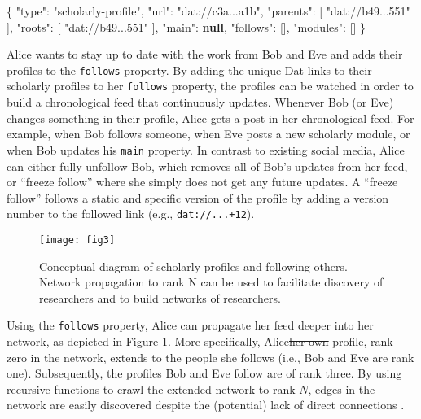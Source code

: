 \documentclass[publications,article,submit,moreauthors,pdftex,10pt,a4paper]{Definitions/mdpi}
\newenvironment{Shaded}{\begin{snugshade}}{\end{snugshade}}
\newcommand{\DataTypeTok}[1]{\textcolor[rgb]{0.13,0.29,0.53}{#1}}
\newcommand{\FunctionTok}[1]{\textcolor[rgb]{0.00,0.00,0.00}{#1}}
\newcommand{\KeywordTok}[1]{\textcolor[rgb]{0.13,0.29,0.53}{\textbf{#1}}}
\newcommand{\OtherTok}[1]{\textcolor[rgb]{0.56,0.35,0.01}{#1}}
\newcommand{\StringTok}[1]{\textcolor[rgb]{0.31,0.60,0.02}{#1}}
\providecommand{\DIFaddtex}[1]{{\protect\color{blue}\uwave{#1}}} %
\providecommand{\DIFdeltex}[1]{{\protect\color{red}\sout{#1}}}                      %
\providecommand{\DIFaddbegin}{} %
\providecommand{\DIFaddend}{} %
\providecommand{\DIFdelbegin}{} %
\providecommand{\DIFdelend}{} %
\providecommand{\DIFadd}[1]{\texorpdfstring{\DIFaddtex{#1}}{#1}} %
\providecommand{\DIFdel}[1]{\texorpdfstring{\DIFdeltex{#1}}{}} %
\newcommand{\DIFscaledelfig}{0.5}
\newlength{\DIFdelgraphicswidth} %
\newlength{\DIFdelgraphicsheight} %
\newcommand{\DIFaddincludegraphics}[2][]{{\color{blue}\fbox{\DIFOincludegraphics[#1]{#2}}}} %
\newcommand{\DIFdelincludegraphics}[2][]{%
\sbox{\DIFdelgraphicsbox}{\DIFOincludegraphics[#1]{#2}}%
\settoboxwidth{\DIFdelgraphicswidth}{\DIFdelgraphicsbox} %
\settoboxtotalheight{\DIFdelgraphicsheight}{\DIFdelgraphicsbox} %
\scalebox{\DIFscaledelfig}{%
\parbox[b]{\DIFdelgraphicswidth}{\usebox{\DIFdelgraphicsbox}\\[-\baselineskip] \rule{\DIFdelgraphicswidth}{0em}}\llap{\resizebox{\DIFdelgraphicswidth}{\DIFdelgraphicsheight}{%
\setlength{\unitlength}{\DIFdelgraphicswidth}%
\begin{picture}(1,1)%
\thicklines\linethickness{2pt} %
{\color[rgb]{1,0,0}\put(0,0){\framebox(1,1){}}}%
{\color[rgb]{1,0,0}\put(0,0){\line( 1,1){1}}}%
{\color[rgb]{1,0,0}\put(0,1){\line(1,-1){1}}}%
\end{picture}%
}\hspace*{3pt}}} %
} %
\DeclareRobustCommand{\DIFaddbegin}{\DIFOaddbegin \let\includegraphics\DIFaddincludegraphics} %
\DeclareRobustCommand{\DIFaddend}{\DIFOaddend \let\includegraphics\DIFOincludegraphics} %
\DeclareRobustCommand{\DIFdelbegin}{\DIFOdelbegin \let\includegraphics\DIFdelincludegraphics} %
\DeclareRobustCommand{\DIFdelend}{\DIFOaddend \let\includegraphics\DIFOincludegraphics} %
\begin{document}
\begin{Shaded}
\begin{Highlighting}[]
\FunctionTok{\{}
  \DataTypeTok{"type"}\FunctionTok{:} \StringTok{"scholarly-profile"}\FunctionTok{,}
  \DataTypeTok{"url"}\FunctionTok{:} \StringTok{"dat://c3a...a1b"}\FunctionTok{,}
  \DataTypeTok{"parents"}\FunctionTok{:} \OtherTok{[} \StringTok{"dat://b49...551"} \OtherTok{]}\FunctionTok{,}
  \DataTypeTok{"roots"}\FunctionTok{:} \OtherTok{[} \StringTok{"dat://b49...551"} \OtherTok{]}\FunctionTok{,}
  \DataTypeTok{"main"}\FunctionTok{:} \KeywordTok{null}\FunctionTok{,}
  \DataTypeTok{"follows"}\FunctionTok{:} \OtherTok{[]}\FunctionTok{,}
  \DataTypeTok{"modules"}\FunctionTok{:} \OtherTok{[]}
\FunctionTok{\}}
\end{Highlighting}
\end{Shaded}

Alice wants to stay up to date with the work from Bob and Eve and adds
their profiles to the \texttt{follows} property. By adding the unique
Dat links to their scholarly profiles to her \texttt{follows} property,
the profiles can be watched in order to build a chronological feed that
continuously updates. Whenever Bob (or Eve) changes something in their
profile, Alice gets a post in her chronological feed. For example, when
Bob follows someone, when Eve posts a new scholarly module, or when Bob
updates his \texttt{main} property. In contrast to existing social
media, Alice can either fully unfollow Bob, which removes all of Bob's
updates from her feed, or ``freeze follow'' where she simply does not
get any future updates. A ``freeze follow'' follows a static and
specific version of the profile by adding a version number to the
followed link (e.g., \texttt{dat://...+12}).

\begin{figure}

{\centering \texttt{[image: fig3]} 

}

\caption{Conceptual diagram of scholarly profiles and following others. Network propagation to rank N can be used to facilitate discovery of researchers and to build networks of researchers.}\label{fig:datcom-fig3}
\end{figure}

Using the \texttt{follows} property, Alice can propagate her feed deeper
into her network, as depicted in Figure \ref{fig:datcom-fig3}. More
specifically, Alice\DIFdelbegin \DIFdel{her own }\DIFdelend \DIFaddbegin \DIFadd{'s personal }\DIFaddend profile, rank zero in the network, extends
to the people she follows (i.e., Bob and Eve are rank one).
Subsequently, the profiles Bob and Eve follow are of rank three. By
using recursive functions to crawl the extended network to rank \(N\),
edges in the network are easily discovered despite the (potential) lack
of direct connections \citep{doi:10.2307/2786545}.
\end{document}
